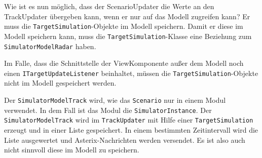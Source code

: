 Wie ist es nun möglich, dass der ScenarioUpdater die Werte an den TrackUpdater übergeben kann, wenn er nur auf das Modell zugreifen kann? Er muss die \texttt{TargetSimulation}-Objekte im Modell speichern. Damit er diese im Modell speichern kann, muss die \texttt{TargetSimulation}-Klasse eine Beziehung zum \texttt{SimulatorModelRadar} haben.

Im Falle, dass die Schnittstelle der ViewKomponente außer dem Modell noch einen \texttt{ITargetUpdateListener} beinhaltet, müssen die \texttt{TargetSimulation}-Objekte nicht im Modell gespeichert werden.

Der \texttt{SimulatorModelTrack} wird, wie das \texttt{Scenario} nur in einem Modul verwendet. In dem Fall ist das Modul die \texttt{SimulatorInstance}. Der \texttt{SimulatorModelTrack} wird im \texttt{TrackUpdater} mit Hilfe einer \texttt{TargetSimulation} erzeugt und in einer Liste gespeichert. In einem bestimmten Zeitintervall wird die Liste ausgewertet und Asterix-Nachrichten werden versendet. Es ist also auch nicht sinnvoll diese im Modell zu speichern.
